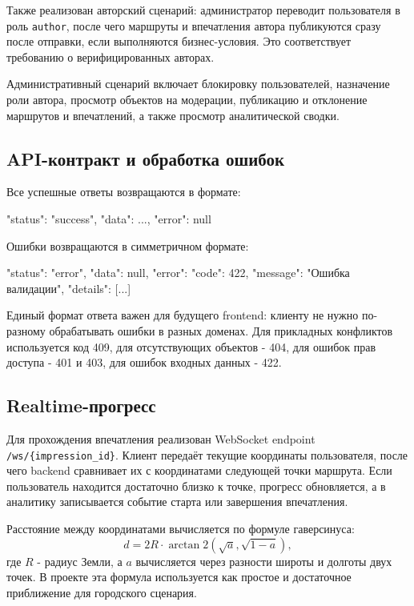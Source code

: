 \documentclass[a4paper,12pt]{extarticle}
\begin{document}
Также реализован авторский сценарий: администратор переводит пользователя в роль \texttt{author}, после чего маршруты и впечатления автора публикуются сразу после отправки, если выполняются бизнес-условия. Это соответствует требованию о верифицированных авторах.

Административный сценарий включает блокировку пользователей, назначение роли автора, просмотр объектов на модерации, публикацию и отклонение маршрутов и впечатлений, а также просмотр аналитической сводки.

\newpage

\subsection{API-контракт и обработка ошибок}

Все успешные ответы возвращаются в формате:
\begin{jsonblock}
{
    "status": "success",
    "data": ...,
    "error": null
}
\end{jsonblock}

Ошибки возвращаются в симметричном формате:
\begin{jsonblock}
{
    "status": "error",
    "data": null,
    "error": {
      "code": 422,
      "message": "Ошибка валидации",
      "details": [...]
    }
}
\end{jsonblock}

Единый формат ответа важен для будущего frontend: клиенту не нужно по-разному обрабатывать ошибки в разных доменах. Для прикладных конфликтов используется код 409, для отсутствующих объектов - 404, для ошибок прав доступа - 401 и 403, для ошибок входных данных - 422.

\subsection{Realtime-прогресс}

Для прохождения впечатления реализован WebSocket endpoint \texttt{/ws/\{impression\_id\}}. Клиент передаёт текущие координаты пользователя, после чего backend сравнивает их с координатами следующей точки маршрута. Если пользователь находится достаточно близко к точке, прогресс обновляется, а в аналитику записывается событие старта или завершения впечатления.

Расстояние между координатами вычисляется по формуле гаверсинуса:
\begin{equation}
	d = 2R \cdot \arctan2\left(\sqrt{a}, \sqrt{1-a}\right),
	\label{eq:haversine}
\end{equation}
где $R$ - радиус Земли, а $a$ вычисляется через разности широты и долготы двух точек. В проекте эта формула используется как простое и достаточное приближение для городского сценария.
\end{document}
